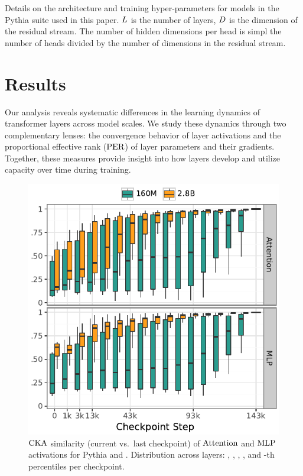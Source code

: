 \begin{table}[!t]
    \centering
    
    \caption{Details on the architecture and training hyper-parameters for models in the Pythia suite used in this paper. $L$ is the number of layers, $D$ is the dimension of the residual stream. The number of hidden dimensions per head is simpl the number of heads divided by the number of dimensions in the residual stream.}
    \label{tab:model_hparams}
\end{table}


\section{Results}
\label{sec:tending-towards-stability-results}

Our analysis reveals systematic differences in the learning dynamics of transformer layers across model scales. We study these dynamics through two complementary lenses: the convergence behavior of layer activations and the proportional effective rank ($\mathrm{PER}$) of layer parameters and their gradients. Together, these measures provide insight into how layers develop and utilize capacity over time during training.

\begin{figure}
    \centering
    \includegraphics[width=0.58\columnwidth]{chapters/tending-towards-stability/figures/cka_main_plot.pdf}
    \caption{$\mathrm{CKA}$ similarity (current vs.\ last checkpoint) of $\mathrm{Attention}$ and $\mathrm{MLP}$ activations for Pythia \sixmil and \twobil. Distribution across layers: , , , , and -th percentiles per checkpoint.}
    \label{fig:cka_main_plot}
\end{figure}

